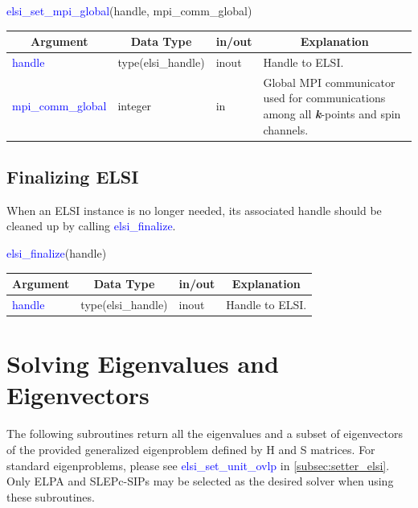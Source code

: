 \documentclass{report}
\begin{document}
\bigskip
\begin{labeling}{\hspace{6cm}}
\item [\hspace{0.3cm} \textcolor{blue}{elsi\_set\_mpi\_global}(handle, mpi\_comm\_global)]
\end{labeling}

\begin{tabular}[]{|p{30mm}|p{30mm}|p{15mm}|p{90mm}|}
\hline
\multicolumn{1}{|c|}{\textbf{Argument}} & \multicolumn{1}{c|}{\textbf{Data Type}} & \multicolumn{1}{c|}{\textbf{in/out}} & \multicolumn{1}{c|}{\textbf{Explanation}}\\
\hline
\textcolor{blue}{handle}            & type(elsi\_handle) & inout & Handle to ELSI.\\
\hline
\textcolor{blue}{mpi\_comm\_global} & integer            & in    & Global MPI communicator used for communications among all \textbf{\textit{k}}-points and spin channels.\\
\hline
\end{tabular}

\subsection{Finalizing ELSI}
\label{subsec:setup_final}
When an ELSI instance is no longer needed, its associated handle should be cleaned up by calling \textcolor{blue}{elsi\_finalize}.\\

\begin{labeling}{\hspace{6cm}}
\item [\hspace{0.3cm} \textcolor{blue}{elsi\_finalize}(handle)]
\end{labeling}

\begin{tabular}[]{|p{30mm}|p{30mm}|p{15mm}|p{90mm}|}
\hline
\multicolumn{1}{|c|}{\textbf{Argument}} & \multicolumn{1}{c|}{\textbf{Data Type}} & \multicolumn{1}{c|}{\textbf{in/out}} & \multicolumn{1}{c|}{\textbf{Explanation}}\\
\hline
\textcolor{blue}{handle} & type(elsi\_handle) & inout & Handle to ELSI.\\
\hline
\end{tabular}

\section{Solving Eigenvalues and Eigenvectors}
\label{sec:ev}
The following subroutines return all the eigenvalues and a subset of eigenvectors of the provided generalized eigenproblem defined by H and S matrices.  For standard eigenproblems, please see \textcolor{blue}{elsi\_set\_unit\_ovlp} in \ref{subsec:setter_elsi}.  Only ELPA and SLEPc-SIPs may be selected as the desired solver when using these subroutines.\\
\end{document}
